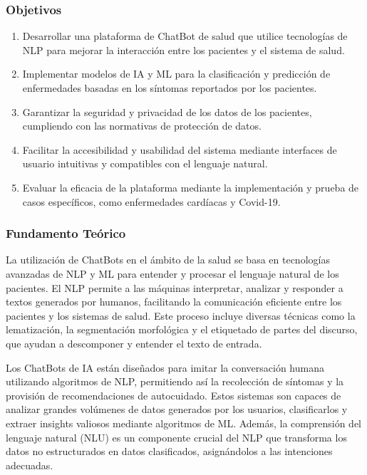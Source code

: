 	\subsubsection{Objetivos}
		\begin{enumerate}
			\item Desarrollar una plataforma de ChatBot de salud que utilice tecnologías de NLP para mejorar la interacción entre los pacientes y el sistema de salud.
			
			\item Implementar modelos de IA y ML para la clasificación y predicción de enfermedades basadas en los síntomas reportados por los pacientes.
			
			\item Garantizar la seguridad y privacidad de los datos de los pacientes, cumpliendo con las normativas de protección de datos.
			
			\item Facilitar la accesibilidad y usabilidad del sistema mediante interfaces de usuario intuitivas y compatibles con el lenguaje natural.
			
			\item Evaluar la eficacia de la plataforma mediante la implementación y prueba de casos específicos, como enfermedades cardíacas y Covid-19.
		\end{enumerate}
			
	\subsubsection{Fundamento Teórico}
		La utilización de ChatBots en el ámbito de la salud se basa en tecnologías avanzadas de NLP y ML para entender y procesar el lenguaje natural de los pacientes. El NLP permite a las máquinas interpretar, analizar y responder a textos generados por humanos, facilitando la comunicación eficiente entre los pacientes y los sistemas de salud. Este proceso incluye diversas técnicas como la lematización, la segmentación morfológica y el etiquetado de partes del discurso, que ayudan a descomponer y entender el texto de entrada.
		
		Los ChatBots de IA están diseñados para imitar la conversación humana utilizando algoritmos de NLP, permitiendo así la recolección de síntomas y la provisión de recomendaciones de autocuidado. Estos sistemas son capaces de analizar grandes volúmenes de datos generados por los usuarios, clasificarlos y extraer insights valiosos mediante algoritmos de ML. Además, la comprensión del lenguaje natural (NLU) es un componente crucial del NLP que transforma los datos no estructurados en datos clasificados, asignándolos a las intenciones adecuadas.
		
